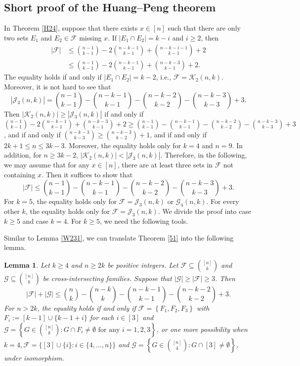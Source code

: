 \documentclass[11pt]{article}
\numberwithin{equation}{section}
\newtheorem{lemma}[theorem]{Lemma}
\begin{document}
\subsection{Short proof of the Huang--Peng theorem}
In Theorem \ref{H24}, suppose that there exists $x \in[n]$ such that there are only two sets $E_1$ and $E_2 \in \mathcal{F}$ missing $x$. If $\left|E_1 \cap E_2\right|=k-i$ and $i \geq 2$, then
\begin{align*}
|\mathcal{F}| & \leq\binom{n-1}{k-1}-2\binom{n-k-1}{k-1}+\binom{n-k-i-1}{k-1}+2 \\
& \leq\binom{n-1}{k-1}-2\binom{n-k-1}{k-1}+\binom{n-k-3}{k-1}+2.
\end{align*}
The equality holds if and only if $\left|E_1 \cap E_2\right|=k-2$, i.e., $\mathcal{F}=\mathcal{K}_2(n, k)$.
Moreover, it is not hard to see that
$$
|\mathcal{J}_3(n, k)| =\binom{n-1}{k-1}-\binom{n-k-1}{k-1}-\binom{n-k-2}{k-2}-\binom{n-k-3}{k-3}+3.
$$
 Then $\left|\mathcal{K}_2(n, k)\right| \geq\left|\mathcal{J}_3(n, k)\right|$ if and only if
$\binom{n-1}{k-1}-2\binom{n-k-1}{k-1}+\binom{n-k-3}{k-1}+2\geq \binom{n-1}{k-1}-\binom{n-k-1}{k-1}-\binom{n-k-2}{k-2}-\binom{n-k-3}{k-3}+3$, and if and only if
$\binom{n-k-3}{k-3}\geq \binom{n-k-3}{k-2}+1$, and if and only if  $2 k+1 \leq n \leq 3 k-3$. Moreover,  the equality holds only for $k=4$ and $n=9$.
In addition, for $n \geq 3 k-2$, $\left|\mathcal{K}_2(n, k)\right|<\left|\mathcal{J}_3(n, k)\right|$. Therefore, in the following, we may assume that for any $x \in[n]$, there are at least three sets in $\mathcal{F}$ not containing $x$. Then it suffices to show that
$$
|\mathcal{F}| \leq\binom{n-1}{k-1}-\binom{n-k-1}{k-1}-\binom{n-k-2}{k-2}-\binom{n-k-3}{k-3}+3.
$$
For $k=5$, the equality holds only for $\mathcal{F}=\mathcal{J}_3(n, k)$ or $\mathcal{G}_4(n, k)$. For every other $k$, the equality holds only for $\mathcal{F}=\mathcal{J}_3(n, k)$.
We divide the proof into case $k\geq 5$ and  case $k=4$. For $k\geq 5$, we need the following tools.


\medskip 

Similar to Lemma \ref{W231}, we can translate Theorem \ref{51} into the following lemma.

\begin{lemma}\label{W232}
Let $k \geq 4$ and $n \geq 2 k$ be positive integers.  Let $\mathcal{F} \subseteq\binom{[n]}{k}$ and $\mathcal{G} \subseteq\binom{[n]}{k}$ be  cross-intersecting families. Suppose that $|\mathcal{G}| \geq|\mathcal{F}| \geq 3$. Then
$$
|\mathcal{F}|+|\mathcal{G}| \leq\binom{n}{k}-\binom{n-k}{k}-\binom{n-k-1}{k-1}-\binom{n-k-2}{k-2}+3.
$$
For $n >2k$, the equality holds if and only if $\mathcal{F}=\left\{F_1, F_2, F_3\right\}$ with $F_i:=[k-1]\cup \{k-1+i\}$ for each $i\in [3]$  and $\mathcal{G}=\left\{G \in\binom{[n]}{k}: G \cap F_i \neq\emptyset \text{ for any } i=1, 2, 3\right\}$, or one more possibility when $k=4, \mathcal{F}=\{[3] \cup\{i\}: i \in\{4, \ldots, n\}\}$ and $\mathcal{G}=\left\{G \in\binom{[n]}{4}: G \cap[3] \neq \emptyset\right\}$, under isomorphism.
\end{lemma}
\end{document}
